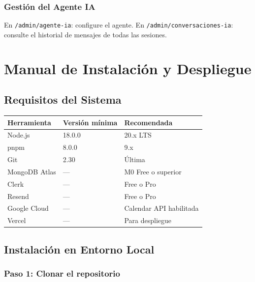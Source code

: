 \documentclass[12pt, a4paper, twoside]{report}
\begin{document}
\subsection{Gestión del Agente IA}

En \texttt{/admin/agente-ia}: configure el agente. En \texttt{/admin/conversaciones-ia}:
consulte el historial de mensajes de todas las sesiones.

\clearpage
\chapter{Manual de Instalación y Despliegue}

\section{Requisitos del Sistema}

\begin{center}
\begin{tabular}{L{4.5cm} C{3cm} C{3.5cm}}
  \toprule
  \textbf{Herramienta} & \textbf{Versión mínima} & \textbf{Recomendada} \\
  \midrule
  Node.js          & 18.0.0 & 20.x LTS \\
  pnpm             & 8.0.0  & 9.x \\
  Git              & 2.30   & Última \\
  MongoDB Atlas    & ---    & M0 Free o superior \\
  Clerk            & ---    & Free o Pro \\
  Resend           & ---    & Free o Pro \\
  Google Cloud     & ---    & Calendar API habilitada \\
  Vercel           & ---    & Para despliegue \\
  \bottomrule
\end{tabular}
\end{center}

\section{Instalación en Entorno Local}

\subsection*{Paso 1: Clonar el repositorio}
\end{document}

